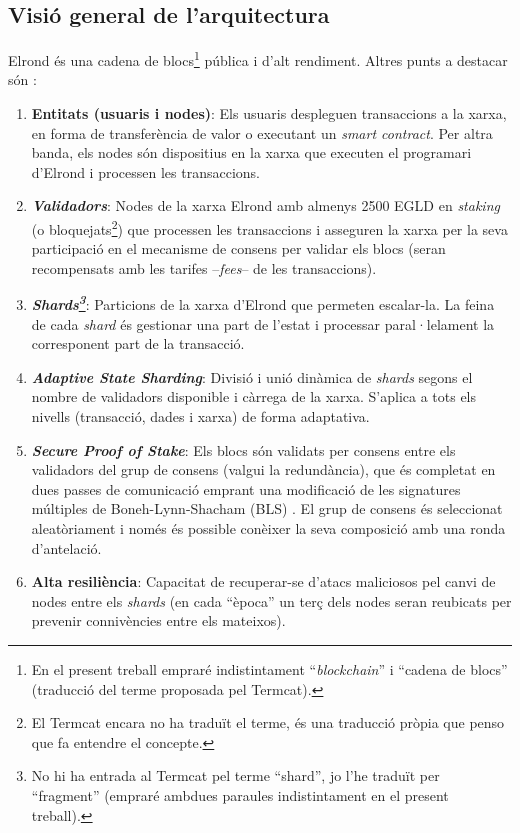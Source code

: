 \documentclass[11pt,a4paper]{article}
\begin{document}
\subsection{Visió general de l'arquitectura}
Elrond és una cadena de blocs\footnote{En el present treball empraré indistintament ``\textit{blockchain}'' i ``cadena de blocs'' (traducció del terme proposada pel Termcat).} pública i d'alt rendiment. Altres punts a destacar són \cite{elrond2022, elrond2022-2}:
\begin{enumerate}
  \item \textbf{Entitats (usuaris i nodes)}: Els usuaris despleguen transaccions a la xarxa, en forma de transferència de valor o executant un \textit{smart contract}. Per altra banda, els nodes són dispositius en la xarxa que executen el programari d'Elrond i processen les transaccions.
  \item \textbf{\textit{Validadors}}: Nodes de la xarxa Elrond amb almenys 2500 EGLD en \textit{staking} (o bloquejats\footnote{El Termcat encara no ha traduït el terme, és una traducció pròpia que penso que fa entendre el concepte.}) que processen les transaccions i asseguren la xarxa per la seva participació en el mecanisme de consens per validar els blocs (seran recompensats amb les tarifes –\textit{fees}– de les transaccions).
  \item \textbf{\textit{Shards\footnote{No hi ha entrada al Termcat pel terme ``shard'', jo l'he traduït per ``fragment'' (empraré ambdues paraules indistintament en el present treball).}}}: Particions de la xarxa d'Elrond que permeten escalar-la. La feina de cada \textit{shard} és gestionar una part de l'estat i processar paral·lelament la corresponent part de la transacció.
  \item \textbf{\textit{Adaptive State Sharding}}: Divisió i unió dinàmica de \textit{shards} segons el nombre de validadors disponible i càrrega de la xarxa. S'aplica a tots els nivells (transacció, dades i xarxa) de forma adaptativa.
  \item \textbf{\textit{Secure Proof of Stake}}: Els blocs són validats per consens entre els validadors del grup de consens (valgui la redundància), que és completat en dues passes de comunicació emprant una modificació de les signatures múltiples de Boneh-Lynn-Shacham (BLS) \cite{Boneh2004}. El grup de consens és seleccionat aleatòriament i només és possible conèixer la seva composició amb una ronda d'antelació.
  \item \textbf{Alta resiliència}: Capacitat de recuperar-se d'atacs maliciosos pel canvi de nodes entre els \textit{shards} (en cada ``època'' un terç dels nodes seran reubicats per prevenir connivències entre els mateixos).

\end{enumerate}
\end{document}

